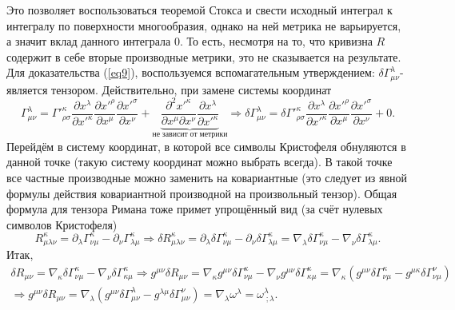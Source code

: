 \documentclass[12pt]{article}
\theoremstyle{definition}
\begin{document}
\begin{enumerate}
Это позволяет воспользоваться теоремой Стокса и свести исходный интеграл к интегралу по поверхности многообразия, однако на ней метрика не варьируется, а значит вклад данного интеграла 0. То есть, несмотря на то, что кривизна $R$ содержит в себе вторые производные метрики, это не сказывается на результате.\\
Для доказательства (\ref{eq9}), воспользуемся вспомагательным утверждением: $\delta \Gamma^{\lambda}_{\mu\nu}$- является тензором. Действительно, при замене системы координат
\begin{equation}
    \Gamma^\lambda_{\mu\nu}=\Gamma'^\kappa_{\rho\sigma}\frac{\partial x^\lambda}{\partial x'^\kappa}\frac{\partial x'^\rho}{\partial x^\mu}\frac{\partial x'^\sigma}{\partial x^\nu}+\underbrace{{\frac{\partial^2 x'^\kappa}{\partial x^\mu\partial x^\nu}\frac{\partial x^\lambda}{\partial x'^\kappa}}}_{не\;зависит\;от\;метрики}\Rightarrow \delta\Gamma^\lambda_{\mu\nu}=\delta \Gamma'^\kappa_{\rho\sigma}\frac{\partial x^\lambda}{\partial x'^\kappa}\frac{\partial x'^\rho}{\partial x^\mu}\frac{\partial x'^\sigma}{\partial x^\nu}+0.
\end{equation}
    Перейдём в систему координат, в которой все символы Кристофеля обнуляются в данной точке (такую систему координат можно выбрать всегда). В такой точке все частные производные можно заменить на ковариантные (это следует из явной формулы действия ковариантной производной на произвольный тензор). Общая формула для тензора Римана тоже примет упрощённый вид (за счёт нулевых символов Кристофеля)
\begin{equation}
    R^{\kappa}_{\mu\lambda\nu}=\partial_{\lambda}\Gamma^{\kappa}_{\nu\mu}-\partial_{\nu}\Gamma^{\kappa}_{\lambda\mu} \Rightarrow \delta R^{\kappa}_{\mu\lambda\nu}=\partial_{\lambda}\delta\Gamma^{\kappa}_{\nu\mu}-\partial_{\nu}\delta\Gamma^{\kappa}_{\lambda\mu}=\nabla_{\lambda}\delta\Gamma^{\kappa}_{\nu\mu}-\nabla_{\nu}\delta\Gamma^{\kappa}_{\lambda\mu}.
\end{equation}
Итак,
\begin{multline}
    \delta R_{\mu\nu}=\nabla_{\kappa}\delta \Gamma^{\kappa}_{\nu\mu}-\nabla_{\nu}\delta \Gamma^{\kappa}_{\kappa\mu} \Rightarrow g^{\mu\nu}\delta R_{\mu\nu} = \nabla_{\kappa} g^{\mu\nu}\delta \Gamma^{\kappa}_{\nu\mu}-\nabla_{\nu} g^{\mu\nu}\delta \Gamma^{\kappa}_{\kappa\mu}=\nabla_{\kappa}\left( g^{\mu\nu}\delta \Gamma^{\kappa}_{\nu\mu}- g^{\mu\kappa}\delta \Gamma^{\nu}_{\nu\mu}\right)\\
    \Rightarrow g^{\mu\nu}\delta R_{\mu\nu}=\nabla_\lambda\left(g^{\mu\nu}\delta\Gamma^{\lambda}_{\mu\nu}-g^{\lambda\mu}\delta\Gamma^{\nu}_{\mu\nu}\right)=\nabla_{\lambda}\omega^\lambda=\omega^{\lambda}_{\;;\lambda}.

\end{multline}
\end{enumerate}
\end{document}

